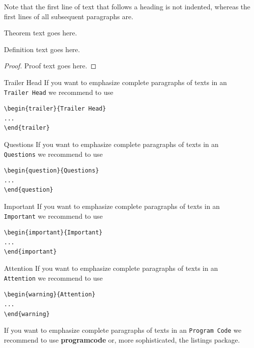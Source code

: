 \begin{bibunit}
Note that the first line of text that follows a heading is not indented, whereas the first lines of all subsequent paragraphs are.
%
%
\begin{theorem}
Theorem text goes here.
\end{theorem}
%
\begin{definition}
Definition text goes here.
\end{definition}
%
\begin{proof}
Proof text goes here.
\end{proof}
%
\begin{trailer}{Trailer Head}
If you want to emphasize complete paragraphs of texts in an \verb|Trailer Head| we recommend to
use  \begin{verbatim}\begin{trailer}{Trailer Head}
...
\end{trailer}\end{verbatim}
\end{trailer}
%
\begin{question}{Questions}
If you want to emphasize complete paragraphs of texts in an \verb|Questions| we recommend to
use  \begin{verbatim}\begin{question}{Questions}
...
\end{question}\end{verbatim}
\end{question}
\eject%
\begin{important}{Important}
If you want to emphasize complete paragraphs of texts in an \verb|Important| we recommend to
use  \begin{verbatim}\begin{important}{Important}
...
\end{important}\end{verbatim}
\end{important}
%
\begin{warning}{Attention}
If you want to emphasize complete paragraphs of texts in an \verb|Attention| we recommend to
use  \begin{verbatim}\begin{warning}{Attention}
...
\end{warning}\end{verbatim}
\end{warning}

If you want to emphasize complete paragraphs of texts in an \verb|Program Code| we recommend to
use \textbf{programcode} or, more sophisticated, the listings package.


\end{bibunit}

